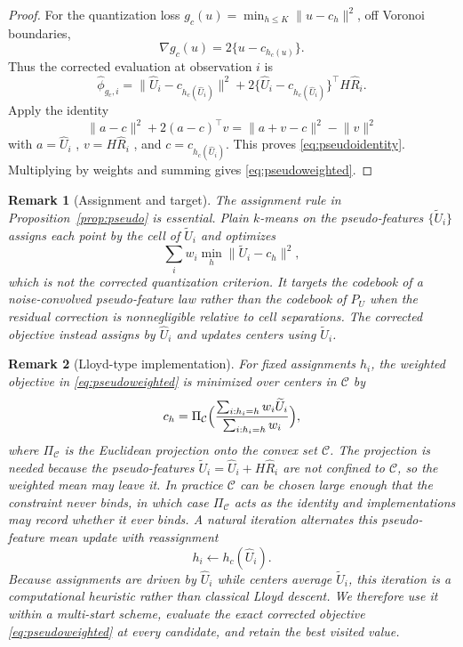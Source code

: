 \documentclass[11pt]{article}
\newtheorem{remark}{Remark}
\newcommand{\calC}{\mathcal C}
\newcommand{\hU}{\widehat U}
\newcommand{\tU}{\widetilde U}
\newcommand{\hR}{\widehat R}
\newcommand{\hphi}{\widehat\phi}
\newcommand{\norm}[1]{\lVert #1\rVert}
\begin{document}
\begin{proof}
For the quantization loss $g_c(u)=\min_{h\le K}\norm{u-c_h}^2$, off Voronoi boundaries,
\[
\nabla g_c(u)=2\{u-c_{h_c(u)}\}.
\]
Thus the corrected evaluation at observation $i$ is
\[
\hphi_{g_c,i}
=
\norm{\hU_i-c_{h_c(\hU_i)}}^2
+
2\{\hU_i-c_{h_c(\hU_i)}\}^\top H\hR_i .
\]
Apply the identity
\[
\norm{a-c}^2+2(a-c)^\top v
=
\norm{a+v-c}^2-\norm{v}^2
\]
with $a=\hU_i$
, $v=H\hR_i$
, and $c=c_{h_c (\hU_i)}$.
This proves \eqref{eq:pseudoidentity}. Multiplying by weights and summing gives \eqref{eq:pseudoweighted}.
\end{proof}

\begin{remark}[Assignment and target]\label{rem:traps}
The assignment rule in Proposition~\ref{prop:pseudo} is essential.  Plain $k$-means on the pseudo-features $\{\tU_i\}$ assigns each point by the cell of $\tU_i$ and optimizes
\[
\sum_i w_i\min_h\norm{\tU_i-c_h}^2,
\]
which is not the corrected quantization criterion.  It targets the codebook of a noise-convolved pseudo-feature law rather than the codebook of $P_U$ when the residual correction is nonnegligible relative to cell separations.  The corrected objective instead assigns by $\hU_i$ and updates centers using $\tU_i$.
\end{remark}

\begin{remark}[Lloyd-type implementation]\label{rem:lloyd}
For fixed assignments $h_i$, the weighted objective in \eqref{eq:pseudoweighted} is minimized over centers in $\calC$ by
\[
c_h
=
\Pi_{\calC}\Bigl(\frac{\sum_{i:h_i=h}w_i\tU_i}
{\sum_{i:h_i=h}w_i}\Bigr),
\]
where $\Pi_{\calC}$ is the Euclidean projection onto the convex set $\calC$. The projection is needed because the pseudo-features $\tU_i=\hU_i+H\hR_i$ are not confined to $\calC$, so the weighted mean may leave it. In practice $\calC$ can be chosen large enough that the constraint never binds, in which case $\Pi_{\calC}$ acts as the identity and implementations may record whether it ever binds.
A natural iteration alternates this pseudo-feature mean update with reassignment
\[
h_i\gets h_c(\hU_i).
\]
Because assignments are driven by $\hU_i$ while centers average $\tU_i$, this iteration is a computational heuristic rather than classical Lloyd descent.  We therefore use it within a multi-start scheme, evaluate the exact corrected objective \eqref{eq:pseudoweighted} at every candidate, and retain the best visited value.
\end{remark}
\end{document}
